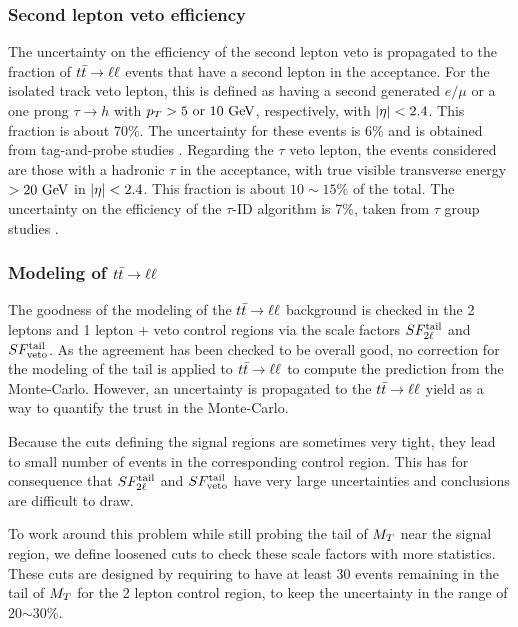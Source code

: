            \subsubsection{Second lepton veto efficiency}

            The uncertainty on the efficiency of the second lepton veto is propagated to the
            fraction of $t\bar{t} \rightarrow \ell \ell$ events that have a second lepton in the acceptance. For
            the isolated track veto lepton, this is defined as having a second generated 
            $e/\mu$ or a one prong $\tau \rightarrow h$ with $p_T > 5 \text{ or } 10 ~\text{GeV}$, 
            respectively, with $\left| \eta \right| < 2.4$. This fraction is about 70\%. The uncertainty 
            for these events is 6\% and is obtained from tag-and-probe studies . Regarding the $\tau$ veto lepton, the events considered are those 
            with a hadronic $\tau$ in the acceptance, with true visible transverse energy $> 20 
            ~\text{GeV}$ in $\left| \eta \right| < 2.4$. This fraction is about $10 \sim 15 \%$ of the total. The 
            uncertainty on the efficiency of the $\tau$-ID algorithm is 7\%, taken from $\tau$ 
            group studies .

            \subsubsection{Modeling of $t\bar{t} \rightarrow \ell \ell$}

            The goodness of the modeling of the $t\bar{t} \rightarrow \ell \ell$ background is checked in the 2
            leptons and 1 lepton + veto control regions via the scale factors $SF_{2\ell}^{\text{tail}}$
            and $SF_{\text{veto}}^{\text{tail}}$. As the agreement has been checked to be overall good, no correction
            for the modeling of the tail is applied to $t\bar{t} \rightarrow \ell \ell$ to compute the prediction
            from the Monte-Carlo. However, an uncertainty is propagated to the $t\bar{t} \rightarrow \ell \ell$ yield 
            as a way to quantify the trust in the Monte-Carlo.

            Because the cuts defining the signal regions are sometimes very tight, they lead to
            small number of events in the corresponding control region. This has for consequence that
            $SF_{2\ell}^{\text{tail}}$ and $SF_{\text{veto}}^{\text{tail}}$ have very large uncertainties and conclusions are
            difficult to draw.

            To work around this problem while still probing the tail of $M_T$ near the signal
            region, we define loosened cuts to check these scale factors with more statistics.
            These cuts are designed by requiring to have at least 30 events remaining in the tail of
            $M_T$ for the 2 lepton control region, to keep the uncertainty in the range of 20$\sim$30\%.
            

